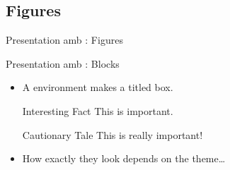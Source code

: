 \subsection{Figures}
\begin{frame}[fragile]{Presentation amb \protect{}: Figures}

\end{frame}

\begin{frame}[fragile]{Presentation amb \protect{}: Blocks}
\begin{itemize}
\item A  environment makes a titled box.
\begin{exampletwouptiny}
\begin{block}{Interesting Fact}
This is important.
\end{block}

\begin{alertblock}{Cautionary Tale}
This is really important!
\end{alertblock}
\end{exampletwouptiny}

\item How exactly they look depends on the theme\dots
\end{itemize}
\end{frame}

